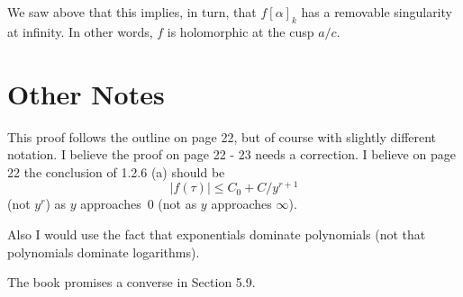 \documentclass {amsart}
\theoremstyle{plain}
\theoremstyle{definition}
\theoremstyle{remark}
\begin{document}
We saw above that this implies, in turn, that $f [\alpha]_k$ has a removable singularity at infinity.
In other words, $f$ is holomorphic at the cusp $a/c$.




\section {Other Notes}

This proof follows the outline on page 22, but of course with slightly different notation.
I believe the proof on page 22 - 23 needs a correction.
I believe on page 22 the conclusion of 1.2.6 (a) should be
$$
|f(\tau)| \le C_0 + C/ y^{r+1}
$$
(not $y^r$) as $y$ approaches~$0$ (not as $y$ approaches $\infty$).

Also I would use the fact that exponentials dominate polynomials (not that polynomials dominate logarithms).

The book promises a converse in Section 5.9.
\end{document}
